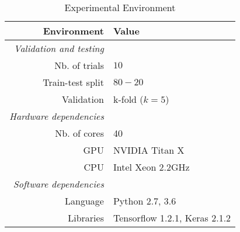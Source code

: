 \begin{table}[h]
    \centering
    \caption{Experimental Environment}
    \label{setup:environment}
    \begin{tabular}{@{}rl@{}}
        \toprule
        Environment             & Value                  \\ \midrule
        \textit{Validation and testing}                  \\ 
        Nb. of trials           & $10$                   \\
        Train-test split        & $80-20$                \\
        Validation              & k-fold ($k=5$)         \\
        \textit{Hardware dependencies}                   \\
        Nb. of cores            & 40                     \\
        GPU                     & NVIDIA Titan X         \\ 
        CPU                     & Intel Xeon 2.2GHz      \\
        \textit{Software dependencies}                   \\
        Language                & Python 2.7, 3.6        \\
        Libraries               & Tensorflow 1.2.1, Keras 2.1.2 \\ \bottomrule
    \end{tabular}
\end{table}




